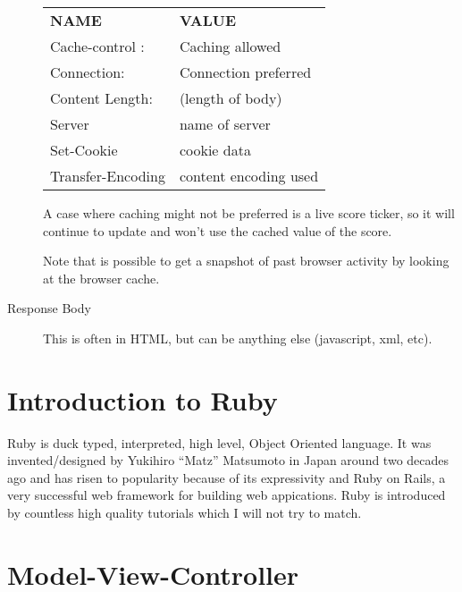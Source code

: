 \documentclass[11pt]{article}
\begin{document}
\begin{description}
\begin{tabular}{ l l }
  \textbf{NAME} & \textbf{VALUE}  \\
  Cache-control : & Caching allowed \\
  Connection: & Connection preferred \\
  Content Length: & (length of body) \\
  Server & name of server  \\
  Set-Cookie & cookie data  \\
  Transfer-Encoding & content encoding used  \\
\end{tabular}

A case where caching might not be preferred is a live score ticker, so it will continue to update and won’t use the cached value of the score.

Note that is possible to get a snapshot of past browser activity by looking at the browser cache.

\item[Response Body]
This is often in HTML, but can be anything else (javascript, xml, etc).
\end{description}



\section{Introduction to Ruby}
\label{sec:ruby}

Ruby is duck typed, interpreted, high level, Object Oriented language. It was invented/designed by Yukihiro ``Matz'' Matsumoto in Japan around two decades ago and has risen to popularity because of its expressivity and Ruby on Rails, a very successful web framework for building web appications. Ruby is introduced by countless high quality tutorials which I will not try to match.




\section{Model-View-Controller}
\label{sec:MVC}
\end{document}
